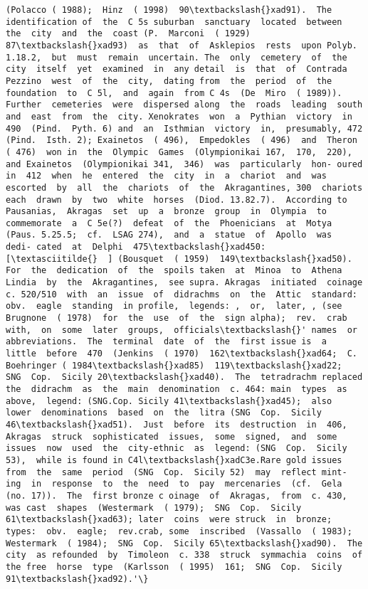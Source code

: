 \documentclass[11pt]{article}
\begin{document}
\begin{Verbatim}[commandchars=\\\{\}]
(Polacco ( 1988);  Hinz  ( 1998)  90\textbackslash{}xad91).  The  identification of  the  C 5s suburban  sanctuary  located  between  the  city  and  the  coast (P.  Marconi  ( 1929)  87\textbackslash{}xad93)  as  that  of  Asklepios  rests  upon Polyb. 1.18.2,  but  must  remain  uncertain. The  only  cemetery  of  the  city  itself  yet  examined  in  any detail  is  that  of  Contrada  Pezzino  west  of  the  city,  dating from  the  period  of  the  foundation  to  C 5l,  and  again  from C 4s  (De  Miro  ( 1989)).  Further  cemeteries  were  dispersed along  the  roads  leading  south  and  east  from  the  city. Xenokrates  won  a  Pythian  victory  in  490  (Pind.  Pyth. 6) and  an  Isthmian  victory  in,  presumably, 472  (Pind.  Isth. 2); Exainetos  ( 496),  Empedokles  ( 496)  and  Theron  ( 476)  won in  the  Olympic  Games  (Olympionikai 167,  170,  220),  and Exainetos  (Olympionikai 341,  346)  was  particularly  hon- oured  in  412  when  he  entered  the  city  in  a  chariot  and  was escorted  by  all  the  chariots  of  the  Akragantines, 300  chariots each  drawn  by  two  white  horses  (Diod. 13.82.7).  According to  Pausanias,  Akragas  set  up  a  bronze  group  in  Olympia  to commemorate  a  C 5e(?)  defeat  of  the  Phoenicians  at  Motya (Paus. 5.25.5;  cf.  LSAG 274),  and  a  statue  of  Apollo  was  dedi- cated  at  Delphi  475\textbackslash{}xad450:  [\textasciitilde{}  ] (Bousquet  ( 1959)  149\textbackslash{}xad50).  For  the  dedication  of  the  spoils taken  at  Minoa  to  Athena  Lindia  by  the  Akragantines,  see supra. Akragas  initiated  coinage  c. 520/510  with  an  issue  of  didrachms  on  the  Attic  standard:  obv.  eagle  standing  in profile,  legends: ,  or,  later, , (see  Brugnone  ( 1978)  for  the  use  of  the  sign alpha);  rev.  crab  with,  on  some  later  groups,  officials\textbackslash{}' names  or  abbreviations.  The  terminal  date  of  the  first issue is  a  little  before  470  (Jenkins  ( 1970)  162\textbackslash{}xad64;  C.  Boehringer ( 1984\textbackslash{}xad85)  119\textbackslash{}xad22;  SNG  Cop.  Sicily 20\textbackslash{}xad40).  The  tetradrachm replaced  the  didrachm  as  the  main  denomination  c. 464: main  types  as  above,  legend: (SNG.Cop. Sicily 41\textbackslash{}xad45);  also  lower  denominations  based  on  the  litra (SNG  Cop.  Sicily 46\textbackslash{}xad51).  Just  before  its  destruction  in  406, Akragas  struck  sophisticated  issues,  some  signed,  and  some  issues  now  used  the  city-ethnic  as  legend: (SNG  Cop.  Sicily 53),  while is found in C4l\textbackslash{}xadC3e.Rare gold issues from  the  same  period  (SNG  Cop.  Sicily 52)  may  reflect mint- ing  in  response  to  the  need  to  pay  mercenaries  (cf.  Gela  (no. 17)).  The  first bronze c oinage  of  Akragas,  from  c. 430,  was cast  shapes  (Westermark  ( 1979);  SNG  Cop.  Sicily 61\textbackslash{}xad63); later  coins  were struck  in  bronze;  types:  obv.  eagle;  rev.crab, some  inscribed  (Vassallo  ( 1983); Westermark  ( 1984);  SNG  Cop.  Sicily 65\textbackslash{}xad90).  The  city  as refounded  by  Timoleon  c. 338  struck  symmachia  coins  of  the free  horse  type  (Karlsson  ( 1995)  161;  SNG  Cop.  Sicily 91\textbackslash{}xad92).'\}

\end{Verbatim}
\end{document}
